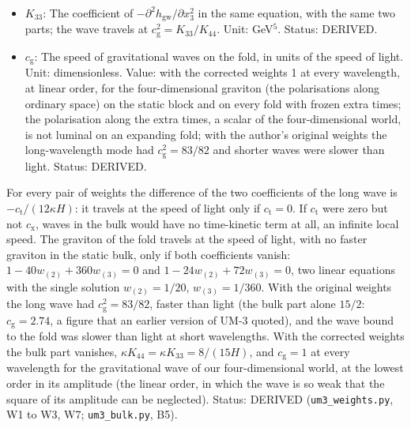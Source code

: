 \documentclass[
  10pt,
]{article}
\begin{document}
\begin{itemize}
  transverse traceless gravitational wave in the bulk at the static
  block, in units of its value with Einstein gravity alone:
  \(c_{\mathrm{t}} = 1 - 40w_{(2)} + 360w_{(3)}\) (FE-68). Unit:
  dimensionless. Value: 0 with the corrected weights; \(1/16\) with the
  author's original weights. Status: DERIVED.
\item
  \(K_{33}\): The coefficient of
  \(-\partial^2h_{\mathrm{gw}}/\partial x_3^2\) in the same equation,
  with the same two parts; the wave travels at
  \(c_{\mathrm{g}}^2 = K_{33}/K_{44}\). Unit: GeV\(^5\). Status:
  DERIVED.
\item
  \(c_{\mathrm{g}}\): The speed of gravitational waves on the fold, in
  units of the speed of light. Unit: dimensionless. Value: with the
  corrected weights 1 at every wavelength, at linear order, for the
  four-dimensional graviton (the polarisations along ordinary space) on
  the static block and on every fold with frozen extra times; the
  polarisation along the extra times, a scalar of the four-dimensional
  world, is not luminal on an expanding fold; with the author's original
  weights the long-wavelength mode had \(c_{\mathrm{g}}^2 = 83/82\) and
  shorter waves were slower than light. Status: DERIVED.
\end{itemize}

For every pair of weights the difference of the two coefficients of the
long wave is \(-c_{\mathrm{t}}/(12\kappa H)\): it travels at the speed
of light only if \(c_{\mathrm{t}} = 0\). If \(c_{\mathrm{t}}\) were zero
but not \(c_{\mathrm{x}}\), waves in the bulk would have no time-kinetic
term at all, an infinite local speed. The graviton of the fold travels
at the speed of light, with no faster graviton in the static bulk, only
if both coefficients vanish: \(1 - 40w_{(2)} + 360w_{(3)} = 0\) and
\(1 - 24w_{(2)} + 72w_{(3)} = 0\), two linear equations with the single
solution \(w_{(2)} = 1/20\), \(w_{(3)} = 1/360\). With the original
weights the long wave had \(c_{\mathrm{g}}^2 = 83/82\), faster than
light (the bulk part alone \(15/2\): \(c_{\mathrm{g}} = 2.74\), a figure
that an earlier version of UM-3 quoted), and the wave bound to the fold
was slower than light at short wavelengths. With the corrected weights
the bulk part vanishes, \(\kappa K_{44} = \kappa K_{33} = 8/(15H)\), and
\(c_{\mathrm{g}} = 1\) at every wavelength for the gravitational wave of
our four-dimensional world, at the lowest order in its amplitude (the
linear order, in which the wave is so weak that the square of its
amplitude can be neglected). Status: DERIVED (\texttt{um3\_weights.py},
W1 to W3, W7; \texttt{um3\_bulk.py}, B5).
\end{document}
